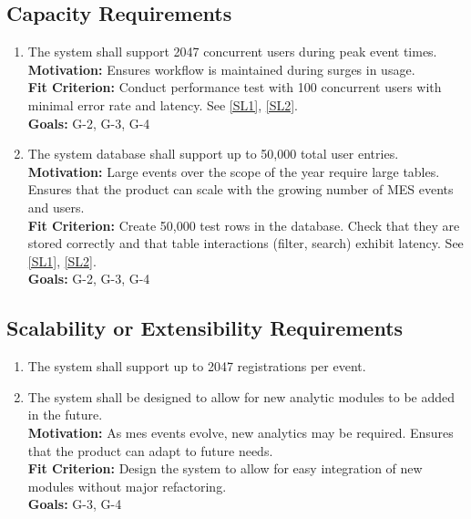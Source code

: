 \documentclass[12pt]{article}
\begin{document}
\subsection{Capacity Requirements}
\begin{enumerate}[label=\bfseries CR-\arabic*:, wide=0pt, leftmargin=*, ref=\bfseries CR-\arabic*]
  \item The system shall support 2047 concurrent users during peak event times.\\
  {\bf Motivation:} Ensures workflow is maintained during surges in usage.\\
  {\bf Fit Criterion:} Conduct performance test with 100 concurrent users with minimal error rate and latency. See \ref{SL1}, \ref{SL2}.\\
  {\bf Goals:} G-2, G-3, G-4
  \item The system database shall support up to 50,000 total user entries.\\
  {\bf Motivation:} Large events over the scope of the year require large tables. Ensures that the product can scale with the growing number of MES events and users.\\
  {\bf Fit Criterion:} Create 50,000 test rows in the database. Check that they are stored correctly and that table interactions (filter, search) exhibit latency. See \ref{SL1}, \ref{SL2}.\\
  {\bf Goals:} G-2, G-3, G-4
\end{enumerate}

\subsection{Scalability or Extensibility Requirements}
\begin{enumerate}[label=\bfseries SE-\arabic*:, wide=0pt, leftmargin=*, ref=\bfseries SE-\arabic*]
  \item \label{SE1} The system shall support up to 2047 registrations per event.
  \item \label{SE2} The system shall be designed to allow for new analytic modules to be added in the future.\\
  {\bf Motivation:} As \Gls{mes} events evolve, new analytics may be required. Ensures that the product can adapt to future needs.\\
  {\bf Fit Criterion:} Design the system to allow for easy integration of new modules without major refactoring.\\
  {\bf Goals:} G-3, G-4
\end{enumerate}
\end{document}
